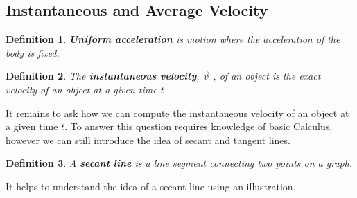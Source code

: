 \documentclass[12pt]{article}
\theoremstyle{break}
\newtheorem{defn}{Definition}[subsection]
\begin{document}
\subsection{Instantaneous and Average Velocity}
\begin{defn}
\textbf{Uniform acceleration} is motion where the acceleration of the body is fixed.
\end{defn}

\begin{defn}
The \textbf{instantaneous velocity}, $\vec v$ , of an object is the \emph{exact} velocity of an object at a given time $t$
\end{defn}

It remains to ask how we can compute the instantaneous velocity of an object at a given time $t$. To answer this question requires knowledge of basic Calculus, however we can still introduce the idea of secant and tangent lines.
\begin{defn}
A \textbf{secant line} is a line segment connecting two points on a graph. 
\end{defn}
It helps to understand the idea of a secant line using an illustration,

\begin{center}
\end{center}

	
\end{document}
